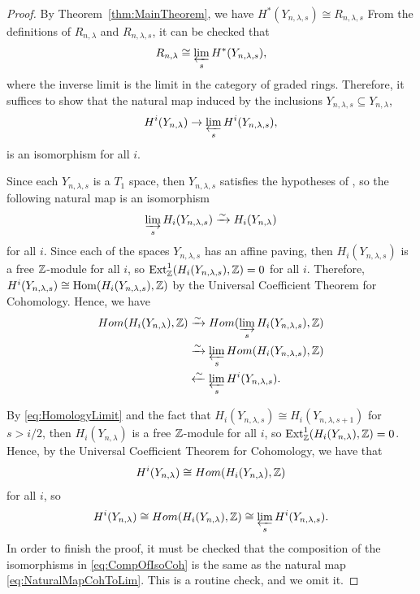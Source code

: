 \documentclass[12pt]{amsart}
\newcommand{\la}{\lambda}
\newcommand{\Hom}{\mathrm{Hom}}
\begin{document}
\begin{proof}
By Theorem~\ref{thm:MainTheorem}, we have $H^*(Y_{n,\lambda,s})\cong R_{n,\la,s}$ From the definitions of $R_{n,\la}$ and $R_{n,\la,s}$, it can be checked that
\begin{align}
R_{n,\la} \cong \varprojlim_s H^*(Y_{n,\la,s}),
\end{align}
where the inverse limit is the limit in the category of graded rings. Therefore, it suffices to show that the natural map induced by the inclusions $Y_{n,\la,s}\subseteq Y_{n,\la}$,
\begin{align}\label{eq:NaturalMapCohToLim}
H^i(Y_{n,\la})\to \varprojlim_s H^i(Y_{n,\la,s}),
\end{align}
is an isomorphism for all $i$.

Since each $Y_{n,\la,s}$ is a $T_1$ space, then $Y_{n,\la,s}$ satisfies the hypotheses of \cite[Proposition 3.33]{Hatcher}, so the following natural map is an isomorphism
\begin{align}\label{eq:HomologyLimit}
\varinjlim_s H_i(Y_{n,\la,s}) \xrightarrow{\sim} H_i(Y_{n,\la})
\end{align}
for all $i$. Since each of the spaces $Y_{n,\la,s}$ has an affine paving, then $H_i(Y_{n,\la,s})$ is a free $\mathbb{Z}$-module for all $i$, so $\mathrm{Ext}^1_\bZ(H_i(Y_{n,\la,s}),\bZ)=0$ for all $i$. Therefore, $H^i(Y_{n,\la,s})\cong \Hom(H_i(Y_{n,\la,s}),\bZ)$ by the Universal Coefficient Theorem for Cohomology. Hence, we have
\begin{align}
    Hom(H_i(Y_{n,\la}),\bZ) &\xrightarrow{\sim} Hom(\varinjlim_s H_i(Y_{n,\la,s}),\bZ)\\
    &\xrightarrow{\sim} \varprojlim_s Hom(H_i(Y_{n,\la,s}),\bZ)\\
    &\xleftarrow{\sim} \varprojlim_s H^i(Y_{n,\la,s}).
\end{align}


By \eqref{eq:HomologyLimit} and the fact that $H_i(Y_{n,\la,s}) \cong H_i(Y_{n,\la,s+1})$ for $s>i/2$, then $H_{i}(Y_{n,\la})$ is a free $\mathbb{Z}$-module for all $i$, so $\mathrm{Ext}^1_\bZ(H_i(Y_{n,\la}),\bZ)=0$. Hence, by the Universal Coefficient Theorem for Cohomology, we have that
\begin{align}
H^i(Y_{n,\la}) \cong Hom(H_i(Y_{n,\la}),\bZ)
\end{align}
for all $i$, so 
\begin{align}\label{eq:CompOfIsoCoh}
H^i(Y_{n,\la}) \cong Hom(H_i(Y_{n,\la}),\bZ) \cong \varprojlim_s H^i(Y_{n,\la,s}).
\end{align}
In order to finish the proof, it must be checked that the composition of the isomorphisms in \eqref{eq:CompOfIsoCoh} is the same as the natural map \eqref{eq:NaturalMapCohToLim}. This is a routine check, and we omit it.
\end{proof}
\end{document}
